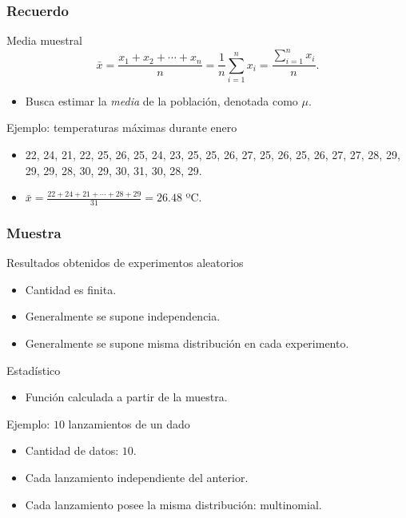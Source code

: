 \documentclass[table]{beamer}
\begin{document}
\begin{frame}
    \frametitle{Recuerdo}
    \begin{block}{Media muestral}
        \begin{equation*}
            \bar{x} = \frac{x_{1} + x_{2} + \cdots + x_{n}}{n} = \frac{1}{n} \sum_{i = 1}^{n} x_{i} = \frac{\sum_{i = 1}^{n} x_{i}}{n}.
        \end{equation*}
        \begin{itemize}
            \item Busca estimar la \emph{media} de la población, denotada como $\mu$.
        \end{itemize}
    \end{block}
    \begin{block}{Ejemplo: temperaturas máximas durante enero}
        \begin{itemize}
            \item 22, 24, 21, 22, 25, 26, 25, 24, 23, 25, 25, 26, 27, 25, 26, 25, 26, 27, 27, 28, 29, 29, 29, 28, 30, 29, 30, 31, 30, 28, 29.
            \item $\bar{x} = \frac{22 + 24 + 21 + \cdots + 28 + 29}{31} = 26.48$ ºC.
        \end{itemize}
    \end{block}
\end{frame}

\begin{frame}
    \frametitle{Muestra}
    \begin{block}{Resultados obtenidos de experimentos aleatorios}
        \begin{itemize}
            \item Cantidad es finita.
            \item Generalmente se supone independencia.
            \item Generalmente se supone misma distribución en cada experimento.
        \end{itemize}
    \end{block}
    \begin{block}{Estadístico}
        \begin{itemize}
            \item Función calculada a partir de la muestra.
        \end{itemize}
    \end{block}
    \begin{block}{Ejemplo: $10$ lanzamientos de un dado}
        \begin{itemize}
            \item Cantidad de datos: $10$.
            \item Cada lanzamiento independiente del anterior.
            \item Cada lanzamiento posee la misma distribución: multinomial.
        \end{itemize}
    \end{block}
\end{frame}
\end{document}
